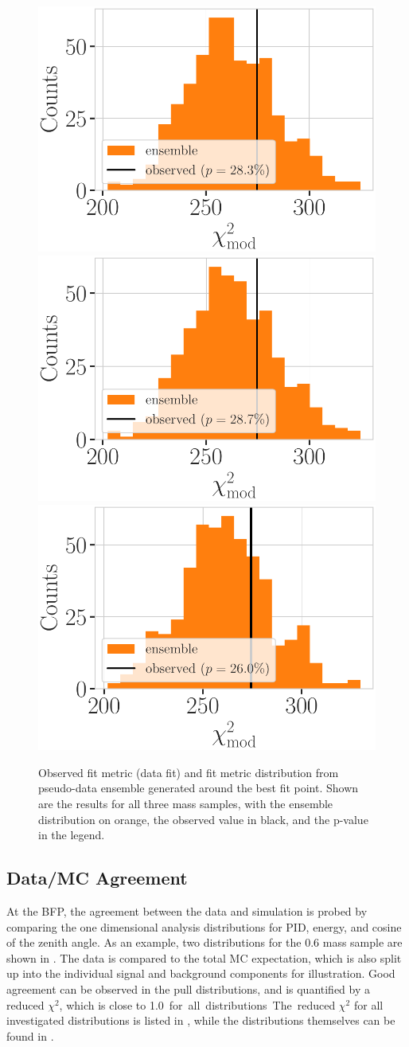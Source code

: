 \begin{figure}[h]
    \includegraphics[width=0.32\linewidth]{figures/results/blind_fits/blind_fit_ensemble_comparison_0.3_GeV.pdf}
    \includegraphics[width=0.32\linewidth]{figures/results/blind_fits/blind_fit_ensemble_comparison_0.6_GeV.pdf}
    \includegraphics[width=0.32\linewidth]{figures/results/blind_fits/blind_fit_ensemble_comparison_1.0_GeV.pdf}
	\caption[Pseudo-data trials fit metric distributions]{Observed fit metric (data fit) and fit metric distribution from pseudo-data ensemble generated around the best fit point. Shown are the results for all three mass samples, with the ensemble distribution on orange, the observed value in black, and the p-value in the legend.}
\end{figure}


\subsection{Data/MC Agreement} 

At the BFP, the agreement between the data and simulation is probed by comparing the one dimensional analysis distributions for PID, energy, and cosine of the zenith angle. As an example, two distributions for the \SI{0.6}{\gev} mass sample are shown in . The data is compared to the total MC expectation, which is also split up into the individual signal and background components for illustration. Good agreement can be observed in the pull distributions, and is quantified by a reduced $\chi^2$, which is close to \SI{1.0} for all distributions. The reduced $\chi^2$ for all investigated distributions is listed in , while the distributions themselves can be found in .

